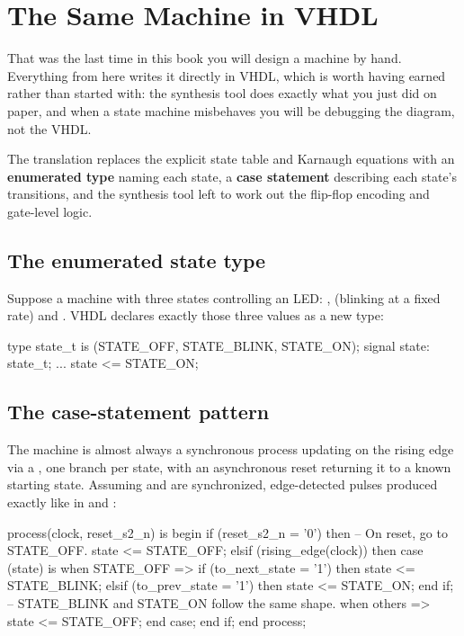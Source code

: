 
\section{The Same Machine in VHDL}
\label{c8:a4}
That was the last time in this book you will design a machine by hand. Everything from here writes
it directly in VHDL, which is worth having earned rather than started with: the synthesis tool does
exactly what you just did on paper, and when a state machine misbehaves you will be debugging the
diagram, not the VHDL.

The translation replaces the explicit state table and Karnaugh equations with an \textbf{enumerated
type} naming each state, a \textbf{case statement} describing each state's transitions, and the
synthesis tool left to work out the flip-flop encoding and gate-level logic.

\subsection{The enumerated state type}
\label{c8:enum}
Suppose a machine with three states controlling an LED: , 
(blinking at a fixed rate) and . VHDL declares exactly those three values as a new
type:

\begin{vhdlcode}
type state_t is (STATE_OFF, STATE_BLINK, STATE_ON);
signal state: state_t;
...
state <= STATE_ON;
\end{vhdlcode}

\subsection{The case-statement pattern}
\label{c8:case}
The machine is almost always a synchronous process updating  on the rising edge via a
, one branch per state, with an asynchronous reset returning it to a known starting
state. Assuming  and  are synchronized, edge-detected pulses
produced exactly like  in  and :

\begin{vhdlcode}
process(clock, reset_s2_n) is
begin
    if (reset_s2_n = '0') then
        -- On reset, go to STATE_OFF.
        state <= STATE_OFF;
    elsif (rising_edge(clock)) then
        case (state) is
            when STATE_OFF =>
                if (to_next_state = '1') then
                    state <= STATE_BLINK;
                elsif (to_prev_state = '1') then
                    state <= STATE_ON;
                end if;
            -- STATE_BLINK and STATE_ON follow the same shape.
            when others =>
                state <= STATE_OFF;
        end case;
    end if;
end process;
\end{vhdlcode}

